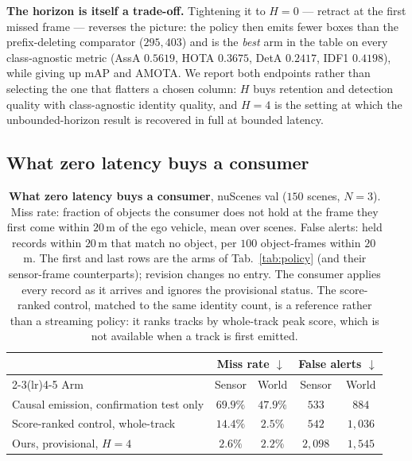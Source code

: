 \noindent\textbf{The horizon is itself a trade-off.} Tightening it to $H{=}0$
--- retract at the first missed frame --- reverses the picture: the policy then
emits fewer boxes than the prefix-deleting comparator ($295{,}403$) and is the \emph{best} arm in the
table on every class-agnostic metric (AssA $0.5619$, HOTA $0.3675$, DetA
$0.2417$, IDF1 $0.4198$), while giving up mAP and AMOTA. We report both
endpoints rather than selecting the one that flatters a chosen column: $H$
buys retention and detection quality with class-agnostic identity quality,
and $H{=}4$ is the setting at which the unbounded-horizon result is recovered
in full at bounded latency.

\subsection{What zero latency buys a consumer}
\label{sec:consumer}

\begin{table}[tb]
\centering\footnotesize
\setlength{\tabcolsep}{2pt}
\begin{tabular}{lcccc}
\toprule
& \multicolumn{2}{c}{Miss rate $\downarrow$} & \multicolumn{2}{c}{False alerts $\downarrow$} \\
\cmidrule(lr){2-3}\cmidrule(lr){4-5}
Arm & Sensor & World & Sensor & World \\
\midrule
Causal emission, confirmation test only & $69.9\%$ & $47.9\%$ & $533$ & $884$ \\
Score-ranked control, whole-track & $14.4\%$ & $2.5\%$ & $542$ & $1{,}036$ \\
Ours, provisional, $H{=}4$ & $2.6\%$ & $2.2\%$ & $2{,}098$ & $1{,}545$ \\
\bottomrule
\end{tabular}
\caption{\textbf{What zero latency buys a consumer}, nuScenes val ($150$
scenes, $N{=}3$). Miss rate: fraction of objects the consumer does not hold at
the frame they first come within $20$\,m of the ego vehicle, mean over scenes.
False alerts: held records within $20$\,m that match no object, per $100$
object-frames within $20$\,m. The first and last rows are the arms of
Tab.~\ref{tab:policy} (and their sensor-frame counterparts); revision changes
no entry. The consumer applies every record as it arrives and ignores the
provisional status. The score-ranked control, matched to the same identity
count, is a reference rather than a streaming policy: it ranks tracks by
whole-track peak score, which is not available when a track is first
emitted.}
\label{tab:consumer}
\end{table}

